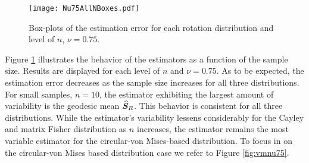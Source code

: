 \begin{figure}[h!]
\centering
\texttt{[image: Nu75AllNBoxes.pdf]}
\caption{Box-plots of the estimation error for each rotation distribution and level of $n$,  $\nu=0.75$.}
\label{fig:NBoxes}
\end{figure}

\noindent Figure \ref{fig:NBoxes} illustrates the behavior of the estimators as a function of the sample size. Results are displayed for each level of $n$ and  $\nu=0.75$. As to be expected, the estimation error decreases as the sample size increases for all three distributions. For small samples, $n=10$, the estimator exhibiting the largest amount of variability is the geodesic mean ${\widehat{\bm S}_R}$. This behavior is consistent for all three distributions.  While the estimator's variability lessens considerably for the Cayley and matrix Fisher distribution as $n$ increases, the estimator remains the most variable estimator for the circular-von Mises-based distribution.   To focus in on the circular-von Mises based distribution case we refer to Figure \ref{fig:vmnu75}.  


